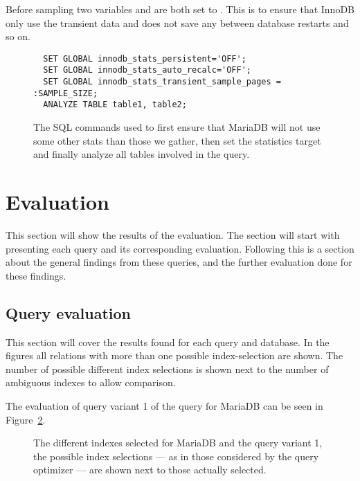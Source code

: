 Before sampling two variables  and
 are both set to . This is to ensure
that InnoDB only use the transient data and does not save any between database
restarts and so on.

\begin{figure}[ht]
\begin{verbatim}
  SET GLOBAL innodb_stats_persistent='OFF';
  SET GLOBAL innodb_stats_auto_recalc='OFF';
  SET GLOBAL innodb_stats_transient_sample_pages = :SAMPLE_SIZE;
  ANALYZE TABLE table1, table2;
\end{verbatim}
\caption[The SQL commands used to resample in MariaDB.]{The SQL commands used to
first ensure that MariaDB will not use some other stats than those we gather,
then set the statistics target and finally analyze all tables involved in the query.}
\label{fig:sql:resamplemdb}
\end{figure}

\section{Evaluation}
This section will show the results of the evaluation. The section will start
with presenting each query and its corresponding evaluation. Following this is a
section about the general findings from these queries, and the further
evaluation done for these findings.

\subsection{Query evaluation}
This section will cover the results found for each query and database. In the
figures all relations with more than one possible index-selection are shown.
The number of possible different index selections is shown next to the number of
ambiguous indexes to allow comparison.

The evaluation of query variant 1 of the query for MariaDB can be seen in
Figure~\ref{fig:plot:mariadb:query1}.

\begin{figure}
\caption[The index selections for MariaDB and query variant 1.]{The different
  indexes selected for MariaDB and the query variant 1, the possible index
  selections --- as in those considered by the query optimizer --- are shown next to
those actually selected.}\label{fig:plot:mariadb:query1}
\end{figure}